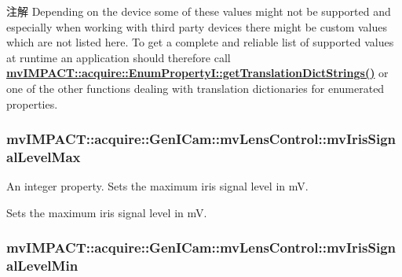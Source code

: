 \begin{DoxyNote}{注解}
Depending on the device some of these values might not be supported and especially when working with third party devices there might be custom values which are not listed here. To get a complete and reliable list of supported values at runtime an application should therefore call {\bfseries \hyperlink{classmv_i_m_p_a_c_t_1_1acquire_1_1_enum_property_i_a0ba6ccbf5ee69784d5d0b537924d26b6}{mv\+I\+M\+P\+A\+C\+T\+::acquire\+::\+Enum\+Property\+I\+::get\+Translation\+Dict\+Strings()}} or one of the other functions dealing with translation dictionaries for enumerated properties. 
\end{DoxyNote}
\hypertarget{classmv_i_m_p_a_c_t_1_1acquire_1_1_gen_i_cam_1_1mv_lens_control_ac71d9986da32f2f6cbe2922876262651}{
\subsubsection[{mv\+Iris\+Signal\+Level\+Max}]{ mv\+I\+M\+P\+A\+C\+T\+::acquire\+::\+Gen\+I\+Cam\+::mv\+Lens\+Control\+::mv\+Iris\+Signal\+Level\+Max}}\label{classmv_i_m_p_a_c_t_1_1acquire_1_1_gen_i_cam_1_1mv_lens_control_ac71d9986da32f2f6cbe2922876262651}


An integer property. Sets the maximum iris signal level in m\+V. 

Sets the maximum iris signal level in m\+V. \hypertarget{classmv_i_m_p_a_c_t_1_1acquire_1_1_gen_i_cam_1_1mv_lens_control_aaf7d5f46be0aeb8d7ed468bff4145d64}{
\subsubsection[{mv\+Iris\+Signal\+Level\+Min}]{ mv\+I\+M\+P\+A\+C\+T\+::acquire\+::\+Gen\+I\+Cam\+::mv\+Lens\+Control\+::mv\+Iris\+Signal\+Level\+Min}}\label{classmv_i_m_p_a_c_t_1_1acquire_1_1_gen_i_cam_1_1mv_lens_control_aaf7d5f46be0aeb8d7ed468bff4145d64}


